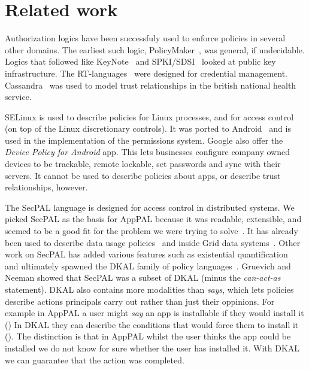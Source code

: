 \documentclass[]{llncs}
\begin{document}
\section{Related work}

Authorization logics have been successfuly used to enforce policies in several other domains.
The earliest such logic, PolicyMaker~\cite{Blaze:dj}, was general, if undecidable.
Logics that followed like KeyNote~\cite{Blaze:1999fa} and SPKI/SDSI~\cite{Ellison:1999ui} looked at public key infrastructure.
The RT-languages~\cite{Li:2002if,Li:2003ix,Li:2003to} were designed for credential management.
Cassandra~\cite{Becker:2004fi} was used to model trust relationships in the british national health service.

SELinux is used to describe policies for Linux processes, and for access control (on top of the Linux discretionary controls).
It was ported to Android~\cite{Smalley:2013vl} and is used in the implementation of the permissions system.
Google also offer the \emph{Device Policy for Android} app.
This lets businesses configure company owned devices to be trackable, remote lockable, set passwords and sync with their servers.
It cannot be used to describe policies about apps, or describe trust relationships, however.

The SecPAL language is designed for access control in distributed systems.
We picked SecPAL as the basis for AppPAL because it was readable, extensible, and seemed to be a good fit for the problem we were trying to solve~\cite{Hallett:2014un}.
It has already been used to describe data usage policies~\cite{Aziz:2011vt} and inside Grid data systems~\cite{Humphrey:2007wc}.
Other work on SecPAL has added various features such as existential quantification~\cite{Becker:2009vt} and ultimately spawned the DKAL family of policy languages~\cite{Gurevich:2008fz,Gurevich:Qo5E3M3}.
Gruevich and Neeman showed that SecPAL was a subset of DKAL (minus the \emph{can-act-as} statement).
DKAL also contains more modalities than \emph{says}, which lets policies describe actions principals carry out rather than just their oppinions.
For example in AppPAL a user might \emph{say} an app is installable if they would install it ()
In DKAL they can describe the conditions that would force them to install it ().
The distinction is that in AppPAL whilst the user thinks the app could be installed we do not know for sure whether the user has installed it.
With DKAL we can guarantee that the action was completed.
\end{document}
